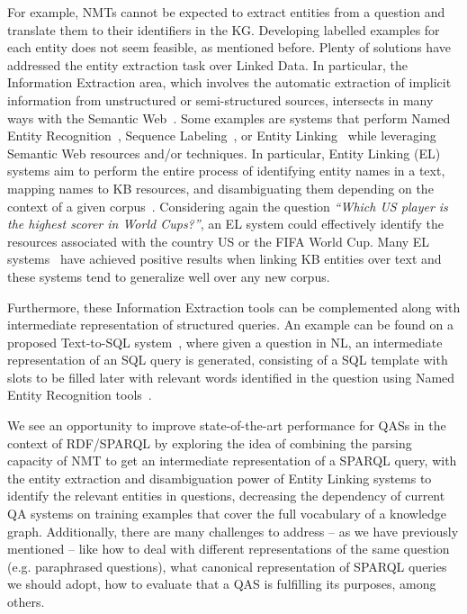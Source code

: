 For example, NMTs cannot be expected to extract entities from a question and translate them to their identifiers in the KG. 
Developing labelled examples for each entity does not seem feasible, as mentioned before. 
Plenty of solutions have addressed the entity extraction task over Linked Data. In particular, 
the Information Extraction area, which involves the automatic extraction of implicit 
information from unstructured or semi-structured sources, intersects in many ways with the 
Semantic Web~\cite{infExtr:MartinezHL19}. Some examples are systems that perform Named Entity 
Recognition~\cite{ner:LampleBSKD16}, Sequence Labeling~\cite{seqlab:MaH16, seqlab:contextual-emb-AkbikBV18}, 
or Entity Linking~\cite{EL:dbpedia-spotlight-MendesJGB11, EL:aida-tool-YosefHBSW11, EL:tagme-FerraginaS10, EL:opentapioca-Delpeuch19} 
while leveraging Semantic Web resources and/or techniques. 
In particular, Entity Linking (EL) systems aim to perform the entire process of identifying entity names in a 
text, mapping names to KB resources, and disambiguating them depending on the context 
of a given corpus~\cite{EL:survey-WuHH18}. Considering again the question \textit{“Which US player is the highest scorer 
in World Cups?”}, an EL system could effectively identify the resources associated with the 
country US or the FIFA World Cup. Many EL systems~\cite{EL:dbpedia-spotlight-MendesJGB11, EL:aida-tool-YosefHBSW11, EL:tagme-FerraginaS10, EL:opentapioca-Delpeuch19} 
have achieved positive results when linking KB entities over text and these systems tend to generalize well 
over any new corpus. 

Furthermore, these Information Extraction tools can be complemented along with intermediate 
representation of structured queries. An example can be found on a proposed 
Text-to-SQL system~\cite{semPar:txt-to-sql-RadevKZZFRS18}, where given a question in NL, an intermediate representation of 
an SQL query is generated, consisting of a SQL template with slots to be filled later with 
relevant words identified in the question using Named Entity Recognition tools~\cite{ner:dynet-NeubigDGMAABCCC17}.

We see an opportunity to improve state-of-the-art performance for QASs in the context 
of RDF/SPARQL by exploring the idea of combining the parsing capacity of NMT to get an 
intermediate representation of a SPARQL query, with the entity extraction and disambiguation 
power of Entity Linking systems to identify the relevant entities in questions, decreasing 
the dependency of current QA systems on training examples that cover the full vocabulary of a 
knowledge graph. Additionally, there are many challenges to address – as we have previously mentioned 
– like how to deal with different representations of the same question (e.g. paraphrased questions), 
what canonical representation of SPARQL queries we should adopt, how to evaluate 
that a QAS is fulfilling its purposes, among others.
